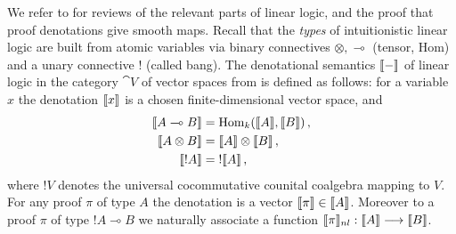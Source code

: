 \documentclass[english,letter paper,12pt,leqno]{article}
\theoremstyle{example}
\numberwithin{equation}{section}
\def\Hom{\operatorname{Hom}}
\begin{document}
We refer to \cite{murfet_ll,murfetclift} for reviews of the relevant parts of linear logic, and the proof that proof denotations give smooth maps. Recall that the \emph{types} of intuitionistic linear logic are built from atomic variables via binary connectives $\otimes, \multimap$ (tensor, Hom) and a unary connective ${!}$ (called bang). The denotational semantics $\llbracket - \rrbracket$ of linear logic in the category $\cat{V}$ of vector spaces from \cite[\S 5.1, \S 5.3]{murfet_ll} is defined as follows: for a variable $x$ the denotation $\llbracket x \rrbracket$ is a chosen finite-dimensional vector space, and
\begin{align*}
\den{A \multimap B} &= \Hom_k(\den{A},\den{B})\,,\\
\den{A \otimes B} &= \den{A} \otimes \den{B}\,,\\
\den{{!}A} &= {!} \den{A}\,,
\end{align*}
where ${!} V$ denotes the universal cocommutative counital coalgebra mapping to $V$. For any proof $\pi$ of type $A$ the denotation is a vector $\llbracket \pi \rrbracket \in \llbracket A \rrbracket$. Moreover to a proof $\pi$ of type ${!} A \multimap B$ we naturally associate \cite[Definition 5.10]{murfet_ll} a function $\llbracket \pi \rrbracket_{nl}: \llbracket A \rrbracket \longrightarrow \llbracket B \rrbracket$.
\end{document}
